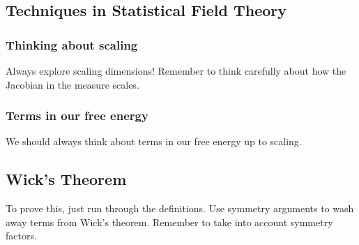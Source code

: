 \subsection{Techniques in Statistical Field Theory} 

\subsubsection{Thinking about scaling}
Always explore scaling dimensions! Remember to think 
carefully about how the Jacobian in the measure scales. 

\subsubsection{Terms in our free energy} 
We should always think about terms in our free energy up to scaling. 

\subsection{Wick's Theorem} 
To prove this, just run through the definitions. 
Use symmetry arguments to wash away terms from Wick's theorem. 
Remember to take into account symmetry factors. 
